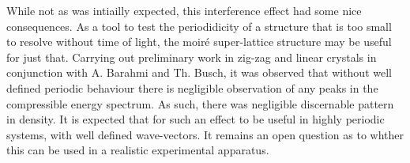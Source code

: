 While not as was intiailly expected, this interference effect had some nice consequences. As a tool to test the periodidicity of a structure that is too small to resolve without time of light, the moir\'e super-lattice structure may be useful for just that. Carrying out preliminary work in zig-zag and linear crystals in conjunction with A. Barahmi and Th. Busch, it was observed that without well defined periodic behaviour there is negligible observation of any peaks in the compressible energy spectrum. As such, there was negligible discernable pattern in density. It is expected that for such an effect to be useful in highly periodic systems, with well defined wave-vectors. It remains an open question as to whther this can be used in a realistic experimental apparatus.




